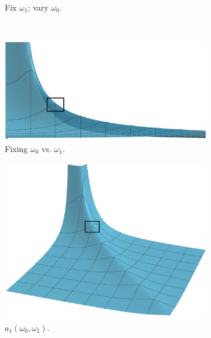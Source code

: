 \documentclass[../notes.tex]{subfiles}
\begin{document}
\begin{itemize}
\begin{figure}[h!]
\begin{subfigure}[b]{0.24\linewidth}
            \caption{Fix $\omega_1$; vary $\omega_0$.}
            \label{fig:resAmpa}
        \end{subfigure}\\[1em]
        \begin{subfigure}[b]{0.45\linewidth}
            \centering
            \includegraphics[width=0.9\linewidth]{../ExtFiles/resAmpb.png}
            \caption{Fixing $\omega_0$ vs. $\omega_1$.}
            \label{fig:resAmpb}
        \end{subfigure}
        \begin{subfigure}[b]{0.3\linewidth}
            \centering
            \includegraphics[width=0.9\linewidth]{../ExtFiles/resAmpc.png}
            \caption{$a_1(\omega_0,\omega_1)$.}
            \label{fig:resAmpc}
        \end{subfigure}\\[1em]
        \begin{subfigure}[b]{0.24\linewidth}
            \centering
\end{subfigure}
\end{figure}
\end{itemize}
\end{document}
